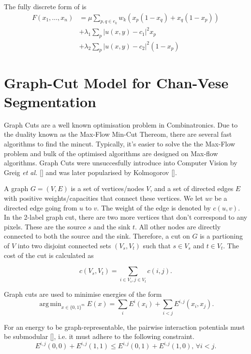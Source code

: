 \documentclass[10pt, journal, letterpaper, onecolumn, draftcls]{IEEEtran}
\DeclareMathOperator*{\argmin}{arg\,min}
\begin{document}
The fully discrete form of  is
\begin{equation}
	\begin{split}
	F(x_1, \ldots, x_n) & = \mu \sum_{p,q \in e_k} w_k( x_p(1-x_q) + x_q(1-x_p)) \\
	& + \lambda_1 \sum_p |u(x,y)-c_1|^2x_p \\
	& + \lambda_2 \sum_p |u(x,y)-c_2|^2(1-x_p)
	\end{split}
	\label{eq:discretemumfordshah}
\end{equation}

\section{Graph-Cut Model for Chan-Vese Segmentation}
Graph Cuts are a well known optimisation problem in Combinatronics. Due to the duality known as the Max-Flow Min-Cut Thereom, there are several fast algorithms to find the mincut. Typically, it's easier to solve the the Max-Flow problem and bulk of the optimised algorithms are designed on Max-flow algorithms. Graph Cuts were unsuccesfully introduce into Computer Vision by Greig \textit{et al.} [] and was later popularised by Kolmogorov [].

A graph $G=(V, E)$ is a set of vertices/nodes $V$, and a set of directed edges $E$ with positive weights/capacities that connect these vertices. We let $uv$ be a directed edge going from $u$ to $v$. The weight of the edge is denoted by $c(u, v)$. In the 2-label graph cut, there are two more vertices that don't correspond to any pixels. These are the source $s$ and the sink $t$. All other nodes are directly connected to both the source and the sink. Therefore, a cut on $G$ is a partioning of $V$ into two disjoint connected sets $(V_s, V_t)$ such that $s \in V_s$ and $t \in V_t$. The cost of the cut is calculated as

\begin{equation}
	c(V_s, V_t) = \sum_{i \in V_s, j \in V_t}c(i, j).
\end{equation}

Graph cuts are used to minimise energies of the form
\begin{equation}
	\argmin_{x \in \{0,1\}^m}	E(x) = \sum_i E^i(x_i) + \sum_{i<j}E^{i,j}(x_i, x_j).
	\label{eq:graphcutenergyform}
\end{equation}

For an energy to be graph-representable, the pairwise interaction potentials must be submodular [], i.e. it must adhere to the following constraint.
\begin{equation}
	E^{i,j}(0,0) + E^{i,j}(1,1) \leq E^{i,j}(0,1) + E^{i,j}(1,0), \, \forall i < j.
\end{equation}
\end{document}
